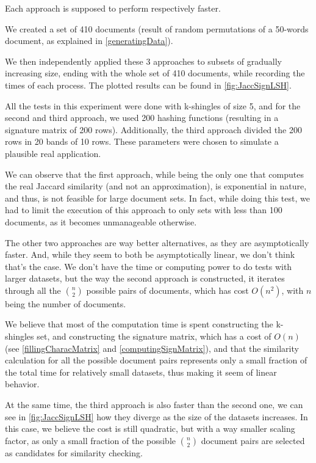 \documentclass[12pt]{article}
\begin{document}
{Each approach is supposed to perform respectively faster.

\bigskip
We created a set of 410 documents (result of random permutations of a 50-words document, as explained in \autoref{generatingData}). 

We then independently applied these 3 approaches to subsets of gradually increasing size, ending with the whole set of 410 documents, while recording the times of each process.
The plotted results can be found in \autoref{fig:JaccSignLSH}.

All the tests in this experiment were done with k-shingles of size 5, and for the second and third approach, we used 200 hashing functions (resulting in a signature matrix of 200 rows). Additionally, the third approach divided the 200 rows in 20 bands of 10 rows. These parameters were chosen to simulate a plausible real application.

\bigskip

We can observe that the first approach, while being the only one that computes the real Jaccard similarity (and not an approximation), is exponential in nature, and thus, is not feasible for large document sets. In fact, while doing this test, we had to limit the execution of this approach to only sets with less than 100 documents, as it becomes unmanageable otherwise.

The other two approaches are way better alternatives, as they are asymptotically faster.
And, while they seem to both be asymptotically linear, we don't think that's the case.
We don't have the time or computing power to do tests with larger datasets, but the way the second approach is constructed, it iterates through all the $\binom{n}{2}$ possible pairs of documents, which has cost $O(n^2)$, with $n$ being the number of documents.

We believe that most of the computation time is spent constructing the k-shingles set, and constructing the signature matrix, which has a cost of $O(n)$ (see \autoref{fillingCharacMatrix} and \autoref{computingSignMatrix}), and that the similarity calculation for all the possible document pairs represents only a small fraction of the total time for relatively small datasets, thus making it seem of linear behavior.

At the same time, the third approach is also faster than the second one, we can see in \autoref{fig:JaccSignLSH} how they diverge as the size of the datasets increases.
In this case, we believe the cost is still quadratic, but with a way smaller scaling factor, as only a small fraction of the possible $\binom{n}{2}$ document pairs are selected as candidates for similarity checking.
\bigskip

}
\end{document}
